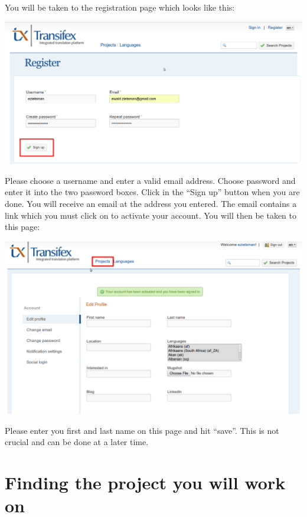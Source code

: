 \documentclass[12pt, a4paper]{article}
\begin{document}
You will be taken to the registration page which looks like this:
\begin{center}
    \centerline{\includegraphics[width=0.8\paperwidth]{images/enterdetails.png}}
\end{center}
Please choose a username and enter a valid email address. Choose password and enter it into the two password boxes. Click in the ``Sign up'' button when you are done. You will receive an email at the address you entered. The email contains a link which you must click on to activate your account. You will then be taken to this page:
\begin{center}
    \centerline{\includegraphics[width=0.8\paperwidth]{images/signedin.png}}
\end{center}
Please enter you first and last name on this page and hit ``save''. This is not crucial and can be done at a later time.



\section{Finding the project you will work on}
\end{document}
